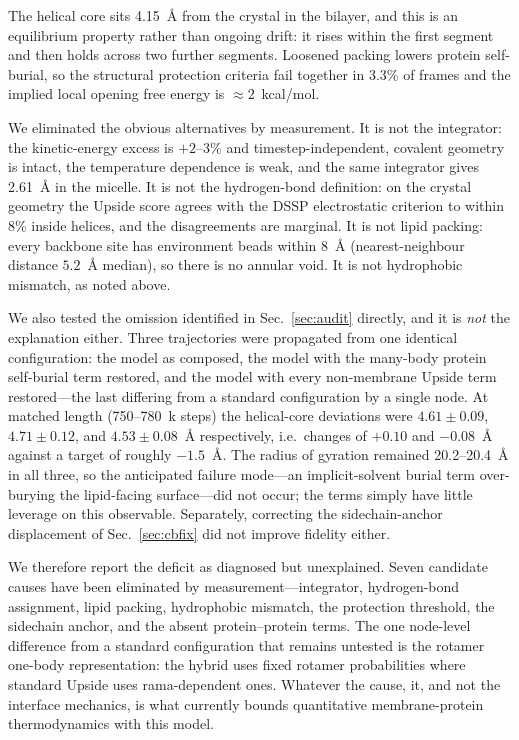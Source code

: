 \documentclass[journal=jctcce,manuscript=article,layout=twocolumn]{achemso}
\begin{document}
The helical core sits 4.15~\AA{} from the crystal in the bilayer, and this is an
equilibrium property rather than ongoing drift: it rises within the first segment
and then holds across two further segments. Loosened packing lowers protein
self-burial, so the structural protection criteria fail together in 3.3\% of frames
and the implied local opening free energy is $\approx2$~kcal/mol.

We eliminated the obvious alternatives by measurement. It is not the integrator: the
kinetic-energy excess is $+2$--$3\%$ and timestep-independent, covalent geometry is
intact, the temperature dependence is weak, and the same integrator gives 2.61~\AA{}
in the micelle. It is not the hydrogen-bond definition: on the crystal geometry the
Upside score agrees with the DSSP electrostatic criterion to within 8\% inside
helices, and the disagreements are marginal. It is not lipid packing: every backbone
site has environment beads within 8~\AA{} (nearest-neighbour distance
$5.2$~\AA{} median), so there is no annular void. It is not hydrophobic mismatch, as
noted above.

We also tested the omission identified in Sec.~\ref{sec:audit} directly, and it is
\emph{not} the explanation either. Three trajectories were propagated from one
identical configuration: the model as composed, the model with the many-body
protein self-burial term restored, and the model with every non-membrane Upside term
restored---the last differing from a standard configuration by a single node. At
matched length (750--780~k steps) the helical-core deviations were
$4.61\pm0.09$, $4.71\pm0.12$, and $4.53\pm0.08$~\AA{} respectively, i.e.\ changes
of $+0.10$ and $-0.08$~\AA{} against a target of roughly $-1.5$~\AA. The radius of
gyration remained 20.2--20.4~\AA{} in all three, so the anticipated failure mode---an
implicit-solvent burial term over-burying the lipid-facing surface---did not occur;
the terms simply have little leverage on this observable. Separately, correcting the
sidechain-anchor displacement of Sec.~\ref{sec:cbfix} did not improve fidelity
either.

We therefore report the deficit as diagnosed but unexplained. Seven candidate causes
have been eliminated by measurement---integrator, hydrogen-bond assignment, lipid
packing, hydrophobic mismatch, the protection threshold, the sidechain anchor, and
the absent protein--protein terms. The one node-level difference from a standard
configuration that remains untested is the rotamer one-body representation: the
hybrid uses fixed rotamer probabilities where standard Upside uses rama-dependent
ones. Whatever the cause, it, and not the interface mechanics, is what currently
bounds quantitative membrane-protein thermodynamics with this model.
\end{document}
